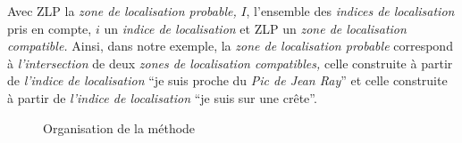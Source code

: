 Avec \textsf{ZLP} la \emph{zone de localisation probable,} \(I\),
l'ensemble des \emph{indices de localisation} pris en compte, \(i\) un
\emph{indice de localisation} et \textsf{ZLP} un \emph{zone de
  localisation compatible.} Ainsi, dans notre exemple, la \emph{zone
  de localisation probable} correspond à \emph{l'intersection} de deux
\emph{zones de localisation compatibles,} celle construite à partir de
\emph{l'indice de localisation} \enquote{je suis proche du \emph{Pic
    de Jean Ray}} et celle construite à partir de \emph{l'indice de
  localisation} \enquote{je suis sur une crête}.

\begin{landscape}
  \begin{figure}[H]
    \centering
    
    \caption{Organisation de la méthode}
    \label{fig:methodo_1}
  \end{figure}
\end{landscape}


